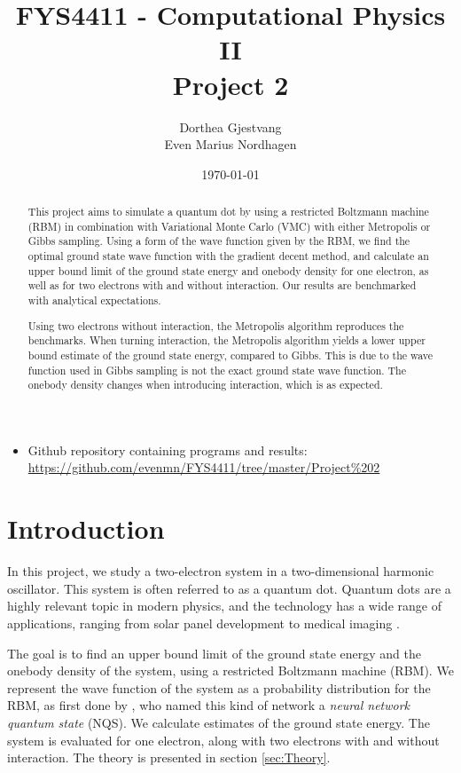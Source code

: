 \documentclass[norsk,a4paper,12pt]{article}
\title{FYS4411 - Computational Physics II\\\vspace{2mm} \Large{Project 2}}
\author{\large Dorthea Gjestvang\\ Even Marius Nordhagen}
\date\today
\begin{document}
\maketitle

\begin{itemize}
\item Github repository containing programs and results: \\\url{https://github.com/evenmn/FYS4411/tree/master/Project%202}
\end{itemize}

\begin{abstract}
This project aims to simulate a quantum dot by using a restricted Boltzmann machine (RBM) in combination with Variational Monte Carlo (VMC) with either Metropolis or Gibbs sampling. Using a form of the wave function given by the RBM, we find the optimal ground state wave function with the gradient decent method, and calculate an upper bound limit of the ground state energy and onebody density for one electron, as well as for two electrons with and without interaction. Our results are benchmarked with analytical expectations. 
\par 

Using two electrons without interaction, the Metropolis algorithm reproduces the benchmarks. When turning interaction, the Metropolis algorithm yields a lower upper bound estimate of the ground state energy, compared to Gibbs. This is due to the wave function used in Gibbs sampling is not the exact ground state wave function. The onebody density changes when introducing interaction, which is as expected.   
\end{abstract}


\newpage

\tableofcontents

\newpage

\section{Introduction} \label{sec:Introduction}
In this project, we study a two-electron system in a two-dimensional harmonic oscillator. This system is often referred to as a quantum dot. Quantum dots are a highly relevant topic in modern physics, and the technology has a wide range of applications, ranging from solar panel development to medical imaging \cite{Chilton}.
\par 
\vspace{3mm}

The goal is to find an upper bound limit of the ground state energy and the onebody density of the system, using a restricted Boltzmann machine (RBM). We represent the wave function of the system as a probability distribution for the RBM, as first done by \cite{Carleo}, who named this kind of network a \emph{neural network quantum state} (NQS). We calculate estimates of the ground state energy. The system is evaluated for one electron, along with two electrons with and without interaction. The theory is presented in section \ref{sec:Theory}.
\par 
\vspace{3mm}
\end{document}

